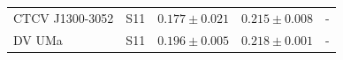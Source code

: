 \begin{table}
\begin{tabular}{llccc}
        CTCV J1300-3052     &  S11      & $0.177 \pm 0.021$ & $0.215 \pm 0.008$ & -                   \\
        DV UMa              &  S11      & $0.196 \pm 0.005$ & $0.218 \pm 0.001$ & -                   \\
        \hline
    \end{tabular}
\end{table}

